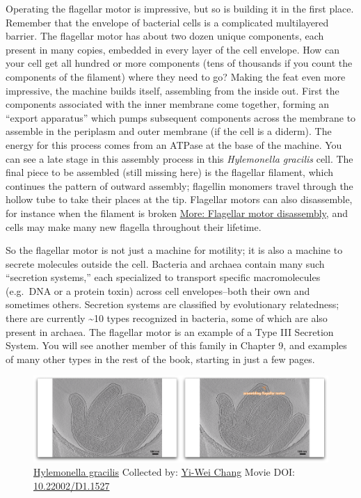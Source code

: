 \documentclass[]{tufte-book}
\begin{document}
Operating the flagellar motor is impressive, but so is building it in
the first place. Remember that the envelope of bacterial cells is a
complicated multilayered barrier. The flagellar motor has about two
dozen unique components, each present in many copies, embedded in every
layer of the cell envelope. How can your cell get all hundred or more
components (tens of thousands if you count the components of the
filament) where they need to go? Making the feat even more impressive,
the machine builds itself, assembling from the inside out. First the
components associated with the inner membrane come together, forming an
``export apparatus'' which pumps subsequent components across the
membrane to assemble in the periplasm and outer membrane (if the cell is
a diderm). The energy for this process comes from an ATPase at the base
of the machine. You can see a late stage in this assembly process in
this \emph{Hylemonella gracilis} cell. The final piece to be assembled
(still missing here) is the flagellar filament, which continues the
pattern of outward assembly; flagellin monomers travel through the
hollow tube to take their places at the tip. Flagellar motors can also
disassemble, for instance when the filament is broken
\protect\hyperlink{Flagellar_motor_disassembly}{More: Flagellar motor
disassembly}, and cells may make many new flagella throughout their
lifetime.

So the flagellar motor is not just a machine for motility; it is also a
machine to secrete molecules outside the cell. Bacteria and archaea
contain many such ``secretion systems,'' each specialized to transport
specific macromolecules (e.g.~DNA or a protein toxin) across cell
envelopes--both their own and sometimes others. Secretion systems are
classified by evolutionary relatedness; there are currently
\textasciitilde{}10 types recognized in bacteria, some of which are also
present in archaea. The flagellar motor is an example of a Type III
Secretion System. You will see another member of this family in Chapter
9, and examples of many other types in the rest of the book, starting in
just a few pages.





\begin{figure}
\includegraphics{movie_stills/6_3} \caption[\protect\hyperlink{tree}{Hylemonella gracilis} Collected by:
\protect\hyperlink{yi-wei_chang}{Yi-Wei Chang} Movie DOI:
\href{https://doi.org/10.22002/D1.1527}{10.22002/D1.1527}]{\protect\hyperlink{tree}{Hylemonella gracilis} Collected by:
\protect\hyperlink{yi-wei_chang}{Yi-Wei Chang} Movie DOI:
\href{https://doi.org/10.22002/D1.1527}{10.22002/D1.1527}}\label{fig:6-3}
\end{figure}
\end{document}
